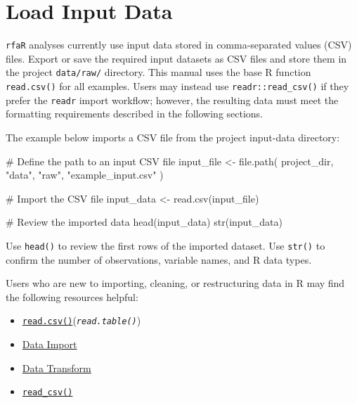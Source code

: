 \documentclass[
  letterpaper,
  DIV=11,
  numbers=noendperiod]{scrreprt}
\newenvironment{Shaded}{\begin{snugshade}}{\end{snugshade}}
\newcommand{\CommentTok}[1]{\textcolor[rgb]{0.37,0.37,0.37}{#1}}
\newcommand{\FunctionTok}[1]{\textcolor[rgb]{0.28,0.35,0.67}{#1}}
\newcommand{\NormalTok}[1]{\textcolor[rgb]{0.00,0.23,0.31}{#1}}
\newcommand{\OtherTok}[1]{\textcolor[rgb]{0.00,0.23,0.31}{#1}}
\newcommand{\StringTok}[1]{\textcolor[rgb]{0.13,0.47,0.30}{#1}}
\providecommand{\tightlist}{%
  \setlength{\itemsep}{0pt}\setlength{\parskip}{0pt}}
\begin{document}
\section{Load Input Data}\label{load-input-data}

\texttt{rfaR} analyses currently use input data stored in
comma-separated values (CSV) files. Export or save the required input
datasets as CSV files and store them in the project \texttt{data/raw/}
directory. This manual uses the base R function \texttt{read.csv()} for
all examples. Users may instead use \texttt{readr::read\_csv()} if they
prefer the \texttt{readr} import workflow; however, the resulting data
must meet the formatting requirements described in the following
sections.

The example below imports a CSV file from the project input-data
directory:

\begin{Shaded}
\begin{Highlighting}[]
\CommentTok{\# Define the path to an input CSV file}
\NormalTok{input\_file }\OtherTok{\textless{}{-}} \FunctionTok{file.path}\NormalTok{(}
\NormalTok{  project\_dir,}
  \StringTok{"data"}\NormalTok{,}
  \StringTok{"raw"}\NormalTok{,}
  \StringTok{"example\_input.csv"}
\NormalTok{)}

\CommentTok{\# Import the CSV file}
\NormalTok{input\_data }\OtherTok{\textless{}{-}} \FunctionTok{read.csv}\NormalTok{(input\_file)}

\CommentTok{\# Review the imported data}
\FunctionTok{head}\NormalTok{(input\_data)}
\FunctionTok{str}\NormalTok{(input\_data)}
\end{Highlighting}
\end{Shaded}

Use \texttt{head()} to review the first rows of the imported dataset.
Use \texttt{str()} to confirm the number of observations, variable
names, and R data types.

Users who are new to importing, cleaning, or restructuring data in R may
find the following resources helpful:

\begin{itemize}
\tightlist
\item
  \href{https://stat.ethz.ch/R-manual/R-devel/library/utils/html/read.table.html}{\texttt{read.csv()}}(\emph{\texttt{read.table()}})
\item
  \href{https://r4ds.hadley.nz/data-import.html}{Data Import}
\item
  \href{https://r4ds.hadley.nz/data-transform.html}{Data Transform}
\item
  \href{https://readr.tidyverse.org/reference/read_delim.html}{\texttt{read\_csv()}}
\end{itemize}
\end{document}
